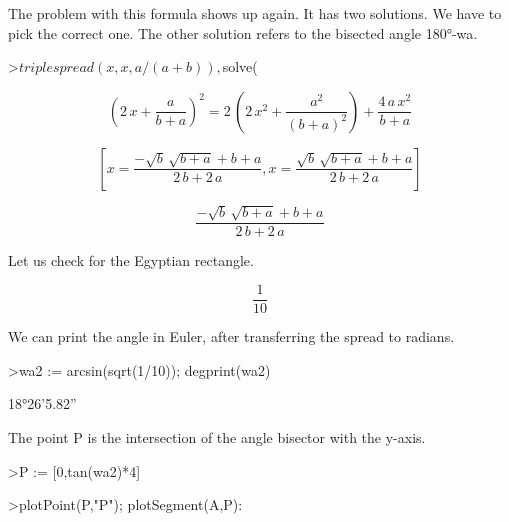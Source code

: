 \documentclass{article}
\begin{document}
\begin{eulernotebook}
\begin{eulercomment}
\begin{eulercomment}
\begin{eulercomment}
\begin{eulercomment}
\begin{eulercomment}
\begin{eulercomment}
\begin{eulercomment}
The problem with this formula shows up again. It has two solutions. We
have to pick the correct one. The other solution refers to the
bisected angle 180°-wa.
\end{eulercomment}
\begin{eulerprompt}
>$triplespread(x,x,a/(a+b)), $solve(%
\end{eulerprompt}
\begin{eulerformula}
\[
\left(2\,x+\frac{a}{b+a}\right)^2=2\,\left(2\,x^2+\frac{a^2}{\left(
 b+a\right)^2}\right)+\frac{4\,a\,x^2}{b+a}
\]
\end{eulerformula}
\begin{eulerformula}
\[
\left[ x=\frac{-\sqrt{b}\,\sqrt{b+a}+b+a}{2\,b+2\,a} , x=\frac{
 \sqrt{b}\,\sqrt{b+a}+b+a}{2\,b+2\,a} \right] 
\]
\end{eulerformula}
\begin{eulerformula}
\[
\frac{-\sqrt{b}\,\sqrt{b+a}+b+a}{2\,b+2\,a}
\]
\end{eulerformula}
\begin{eulercomment}
Let us check for the Egyptian rectangle.
\end{eulercomment}
\begin{eulerformula}
\[
\frac{1}{10}
\]
\end{eulerformula}
\begin{eulercomment}
We can print the angle in Euler, after transferring the spread to
radians.
\end{eulercomment}
\begin{eulerprompt}
>wa2 := arcsin(sqrt(1/10)); degprint(wa2)
\end{eulerprompt}
\begin{euleroutput}
  18°26'5.82''
\end{euleroutput}
\begin{eulercomment}
The point P is the intersection of the angle bisector with the y-axis.
\end{eulercomment}
\begin{eulerprompt}
>P := [0,tan(wa2)*4]
\end{eulerprompt}
\begin{euleroutput}
  [0,  1.33333]
\end{euleroutput}
\begin{eulerprompt}
>plotPoint(P,"P"); plotSegment(A,P):
\end{eulerprompt}

\end{eulercomment}
\end{eulercomment}
\end{eulercomment}
\end{eulercomment}
\end{eulercomment}
\end{eulercomment}
\end{eulernotebook}
\end{document}
